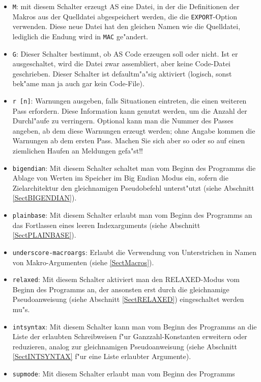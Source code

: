 \documentclass[12pt,a4paper,twoside]{report}
\newcommand{\tty}[1]{{\tt #1}}
\newcommand{\asname}{AS}
\begin{document}
\begin{itemize}
{      der Datei ist \tty{I}.}
\item{\tty{M}: mit diesem Schalter erzeugt \asname{} eine Datei, in der die Definitionen
      der Makros aus der Quelldatei abgespeichert werden, die die
      \tty{EXPORT}-Option verwenden.  Diese neue Datei hat den gleichen
      Namen wie die Quelldatei, lediglich die Endung wird in \tty{MAC} ge"andert.}
\item{\tty{G}: Dieser Schalter bestimmt, ob \asname{} Code erzeugen soll oder nicht.
      Ist er ausgeschaltet, wird die Datei zwar assembliert,
      aber keine Code-Datei geschrieben. Dieser Schalter ist defaultm"a"sig aktiviert
      (logisch, sonst bek"ame man ja auch gar kein Code-File).}
\item{\tty{r [n]}: Warnungen ausgeben, falls Situationen eintreten, die
      einen weiteren Pass erfordern.  Diese Information kann genutzt
      werden, um die Anzahl der Durchl"aufe zu verringern.  Optional kann
      man die Nummer des Passes angeben, ab dem diese Warnungen erzeugt
      werden; ohne Angabe kommen die Warnungen ab dem ersten Pass.  Machen
      Sie sich aber so oder so auf einen ziemlichen Haufen an Meldungen
      gefa"st!!}
\item{\tty{bigendian}: Mit diesem Schalter schaltet man vom Beginn des
      Programms die Ablage von Werten im Speicher im Big Endian Modus ein,
      sofern die Zielarchitektur den gleichnamigen Pseudobefehl unterst"utzt
      (siehe Abschnitt \ref{SectBIGENDIAN}).}
\item{\tty{plainbase}: Mit diesem Schalter erlaubt man vom Beginn des
      Programms an das Fortlassen eines leeren Indexarguments (siehe Abschnitt
      \ref{SectPLAINBASE}).}
\item{\tty{underscore-macroargs}: Erlaubt die Verwendung von Unterstrichen in
      Namen von Makro-Argumenten (siehe \ref{SectMacros}).}
\item{\tty{relaxed}: Mit diesem Schalter aktiviert man den RELAXED-Modus
      vom Beginn des Programms an, der ansonsten erst durch die gleichnamige
      Pseudoanweisung (siehe Abschnitt \ref{SectRELAXED}) eingeschaltet
      werden mu"s.}
\item{\tty{intsyntax}: Mit diesem Schalter kann man vom Beginn des Programms
      an die Liste der erlaubten Schreibweisen f"ur Ganzzahl-Konstanten
      erweitern oder reduzieren, analog zur gleichnamigen Pseudoanweisung
      (siehe Abschnitt \ref{SectINTSYNTAX} f"ur eine Liste erlaubter
      Argumente).}
\item{\tty{supmode}: Mit diesem Schalter erlaubt man vom Beginn des Programms
}
\end{itemize}
\end{document}
